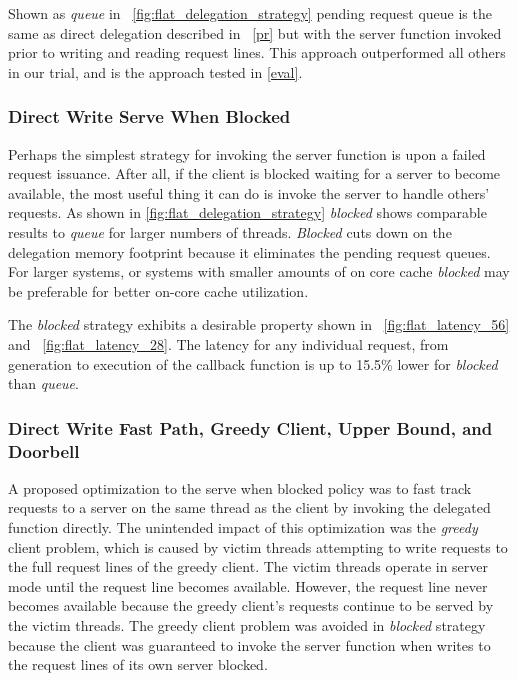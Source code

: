 \documentclass{uicthesi}
\newcounter{problem}
\begin{document}
Shown as \textit{queue} in ~\ref{fig:flat_delegation_strategy} pending request queue is the same as direct delegation described in ~\autoref{pr} but with the server function invoked prior to writing and reading request lines. This approach outperformed all others in our trial, and is the approach tested in \autoref{eval}. 

\subsubsection{Direct Write Serve When Blocked}

Perhaps the simplest strategy for invoking the server function is upon a failed request issuance. After all, if the client is blocked waiting for a server to become available, the most useful thing it can do is invoke the server to handle others' requests. As shown in \ref{fig:flat_delegation_strategy} \textit{blocked} shows comparable results to \textit{queue} for larger numbers of threads. \textit{Blocked} cuts down on the delegation memory footprint because it eliminates the pending request queues. For larger systems, or systems with smaller amounts of on core cache \textit{blocked} may be preferable for better on-core cache utilization. 

The \textit{blocked} strategy exhibits a desirable property shown in ~\ref{fig:flat_latency_56} and ~\ref{fig:flat_latency_28}. The latency for any individual request, from generation to execution of the callback function is up to 15.5\% lower for \textit{blocked} than \textit{queue}. 

\subsubsection{Direct Write Fast Path, Greedy Client, Upper Bound, and Doorbell}
A proposed optimization to the serve when blocked policy was to fast track requests to a server on the same thread as the client by invoking the delegated function directly. The unintended impact of this optimization was the \textit{greedy} client problem, which is caused by victim threads attempting to write requests to the full request lines of the greedy client. The victim threads operate in server mode until the request line becomes available. However, the request line never becomes available because the greedy client's requests continue to be served by the victim threads. The greedy client problem was avoided in \textit{blocked} strategy because the client was guaranteed to invoke the server function when writes to the request lines of its own server blocked. 
\end{document}
